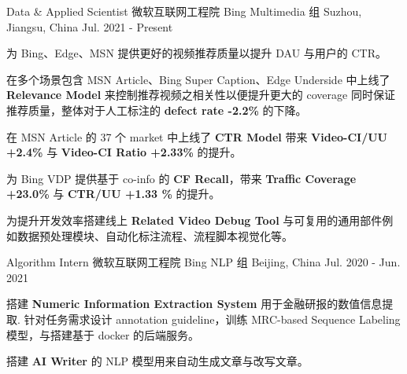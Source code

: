 

\begin{cventries}

  \cventry
    {Data \& Applied Scientist} %
    {微软互联网工程院 Bing Multimedia 组} %
    {Suzhou, Jiangsu, China} %
    {Jul. 2021 - Present} %
    {
      \begin{cvitems} %
        \item {为 Bing、Edge、MSN 提供更好的视频推荐质量以提升 DAU 与用户的 CTR。}
        \item {在多个场景包含 MSN Article、Bing Super Caption、Edge Underside 中上线了 \textbf{Relevance Model} 来控制推荐视频之相关性以便提升更大的 coverage 同时保证推荐质量，整体对于人工标注的 \textbf{defect rate -2.2\%} 的下降。}
        \item {在 MSN Article 的 37 个 market 中上线了 \textbf{CTR Model} 带来 \textbf{Video-CI/UU +2.4\%} 与 \textbf{Video-CI Ratio +2.33\%} 的提升。}
        \item {为 Bing VDP 提供基于 co-info 的 \textbf{CF Recall}，带来 \textbf{Traffic Coverage +23.0\%} 与 \textbf{CTR/UU +1.33 \%} 的提升。}
        \item {为提升开发效率搭建线上 \textbf{Related Video Debug Tool} 与可复用的通用部件例如数据预处理模块、自动化标注流程、流程脚本视觉化等。}
      \end{cvitems}
    }

  \cventry
    {Algorithm Intern} %
    {微软互联网工程院 Bing NLP 组} %
    {Beijing, China} %
    {Jul. 2020 - Jun. 2021} %
    {
      \begin{cvitems} %
        \item {搭建 \textbf{Numeric Information Extraction System} 用于金融研报的数值信息提取. 针对任务需求设计 annotation guideline，训练 MRC-based Sequence Labeling 模型，与搭建基于 docker 的后端服务。}
        \item {搭建 \textbf{AI Writer} 的 NLP 模型用来自动生成文章与改写文章。}
      \end{cvitems}
    }


\end{cventries}
